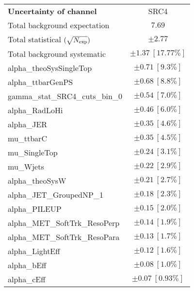 
\begin{table}
\begin{center}
\setlength{\tabcolsep}{0.0pc}
\begin{tabular*}{\textwidth}{@{\extracolsep{\fill}}lc}
\noalign{\smallskip}\hline\noalign{\smallskip}
{\bf Uncertainty of channel}                                    & SRC4            \\
\noalign{\smallskip}\hline\noalign{\smallskip}
Total background expectation             &  $7.69$       \\
\noalign{\smallskip}\hline\noalign{\smallskip}
Total statistical $(\sqrt{N_{\rm exp}})$              & $\pm 2.77$       \\
Total background systematic               & $\pm 1.37\ [17.77\%] $             \\
\noalign{\smallskip}\hline\noalign{\smallskip}
\noalign{\smallskip}\hline\noalign{\smallskip}
alpha\_theoSysSingleTop         & $\pm 0.71\ [9.3\%] $       \\
alpha\_ttbarGenPS         & $\pm 0.68\ [8.8\%] $       \\
gamma\_stat\_SRC4\_cuts\_bin\_0         & $\pm 0.54\ [7.0\%] $       \\
alpha\_RadLoHi         & $\pm 0.46\ [6.0\%] $       \\
alpha\_JER         & $\pm 0.35\ [4.6\%] $       \\
mu\_ttbarC         & $\pm 0.35\ [4.5\%] $       \\
mu\_SingleTop         & $\pm 0.24\ [3.1\%] $       \\
mu\_Wjets         & $\pm 0.22\ [2.9\%] $       \\
alpha\_theoSysW         & $\pm 0.21\ [2.7\%] $       \\
alpha\_JET\_GroupedNP\_1         & $\pm 0.18\ [2.3\%] $       \\
alpha\_PILEUP         & $\pm 0.15\ [2.0\%] $       \\
alpha\_MET\_SoftTrk\_ResoPerp         & $\pm 0.14\ [1.9\%] $       \\
alpha\_MET\_SoftTrk\_ResoPara         & $\pm 0.13\ [1.7\%] $       \\
alpha\_LightEff         & $\pm 0.12\ [1.6\%] $       \\
alpha\_bEff         & $\pm 0.08\ [1.0\%] $       \\
alpha\_cEff         & $\pm 0.07\ [0.93\%] $       \\

\end{tabular*}
\end{center}
\end{table}
